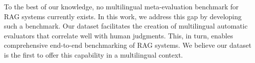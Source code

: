 


To the best of our knowledge, no multilingual meta-evaluation benchmark for RAG systems currently exists. In this work, we address this gap by developing such a benchmark. Our dataset facilitates the creation of multilingual automatic evaluators that correlate well with human judgments. This, in turn, enables comprehensive end-to-end benchmarking of RAG systems. We believe our dataset is the first to offer this capability in a multilingual context.